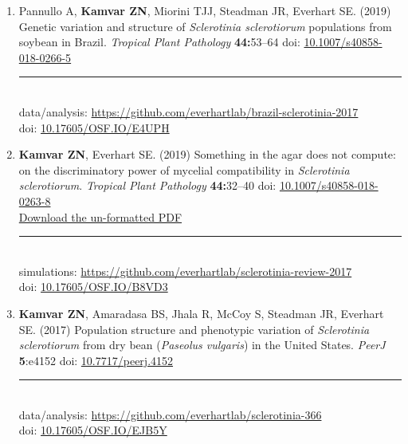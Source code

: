 \begin{enumerate}[leftmargin = 14pt]
  \item Pannullo A, \textbf{Kamvar ZN}, Miorini TJJ, Steadman JR, Everhart SE.
    (2019) Genetic variation and structure of \textit{Sclerotinia sclerotiorum}
    populations from soybean in Brazil. \textit{Tropical Plant Pathology} \textbf{44:}53--64 doi:
    \href{https://doi.org/10.1007/s40858-018-0266-5}{10.1007/s40858-018-0266-5}\\
	\rule[0.25\baselineskip]{0.25\textwidth}{0.5pt}\\
  data/analysis: \href{https://github.com/everhartlab/brazil-sclerotinia-2017#readme}{https://github.com/everhartlab/brazil-sclerotinia-2017}\\
  doi:\phantom{t/analysis:}  \href{https://doi.org/10.17605/OSF.IO/E4UPH}{10.17605/OSF.IO/E4UPH} 

	\vspace{3pt}
  
  \item \textbf{Kamvar ZN}, Everhart SE. (2019) Something in the agar does not
    compute: on the discriminatory power of mycelial compatibility in
    \textit{Sclerotinia sclerotiorum}. \textit{Tropical Plant Pathology} \textbf{44:}32--40  doi:
    \href{https://doi.org/10.1007/s40858-018-0263-8}{10.1007/s40858-018-0263-8}\\
    \href{https://github.com/everhartlab/sclerotinia-review-2017/raw/master/manuscript/review.pdf}{Download the un-formatted PDF}\\
	\rule[0.25\baselineskip]{0.25\textwidth}{0.5pt}\\
  simulations: \href{https://github.com/everhartlab/sclerotinia-review-2017#readme}{https://github.com/everhartlab/sclerotinia-review-2017}\\
    doi:\phantom{mlatons:} \href{https://doi.org/10.17605/OSF.IO/B8VD3}{10.17605/OSF.IO/B8VD3} 

	\vspace{3pt}
  
	\item \textbf{Kamvar ZN}, Amaradasa BS, Jhala R, McCoy S, Steadman JR,
	Everhart SE. (2017) Population structure and phenotypic variation of
	\textit{Sclerotinia sclerotiorum} from dry bean (\textit{Paseolus vulgaris})
	in the United States. \textit{PeerJ} \textbf{5}:e4152 doi: \href{https://doi.org/10.7717/peerj.4152}{10.7717/peerj.4152}\\
	\rule[0.25\baselineskip]{0.25\textwidth}{0.5pt}\\
	data/analysis: \href{https://github.com/everhartlab/sclerotinia-366#readme}{https://github.com/everhartlab/sclerotinia-366}\\
	doi:\phantom{t/analysis:}
	\href{https://doi.org/10.17605/OSF.IO/EJB5Y}{10.17605/OSF.IO/EJB5Y}


\end{enumerate}
